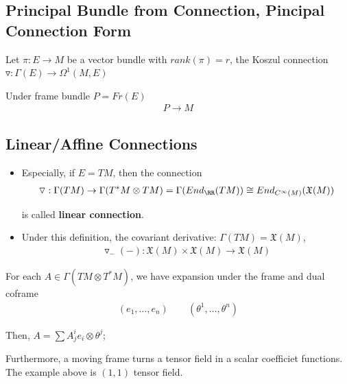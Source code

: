 \documentclass[Total.tex]{subfiles}
\begin{document}
		\subsection{Principal Bundle from Connection, Pincipal Connection Form}
			\begin{Def}
				Let $\pi:E\rightarrow M$ be a vector bundle with $rank(\pi)=r$, the Koszul connection $\triangledown:\Gamma(E)\rightarrow \Omega^1(M,E)$
				
				Under frame bundle $P=Fr(E)$
				\begin{gather*}
					P\rightarrow M
				\end{gather*}
			\end{Def}
		\subsection{Linear/Affine Connections}
		
		\begin{Def}
			\begin{itemize}
				\item Especially, if $E=TM$, then the connection
				\begin{gather*}
					\triangledown:\Gamma(TM)\rightarrow \Gamma(T^*M\otimes TM)=\Gamma(End_\RR(TM))\cong End_{C^\infty(M)}(\mathfrak{X}(M))
				\end{gather*}
				
				is called \textbf{linear connection}.
				
				\item Under this definition, the covariant derivative: $\Gamma(TM)=\mathfrak{X}(M)$, 
				\begin{gather*}
					\triangledown_{-}(-):\mathfrak{X}(M)\times \mathfrak{X}(M)\rightarrow \mathfrak{X}(M)
				\end{gather*}
				
			\end{itemize}
		\end{Def}
		
		For each $A\in \Gamma(TM\otimes T^* M)$, we have expansion under the frame and dual coframe
		\begin{gather*}
			(e_1,\dots,e_n)\qquad (\theta^1,\dots,\theta^n)
		\end{gather*}
		
		Then, $A=\sum A^i_j e_i\otimes \theta^j$;
		
		Furthermore, a moving frame turns a tensor field in a scalar coefficiet functions. The example above is $(1,1)$ tensor field.
		
\end{document}
